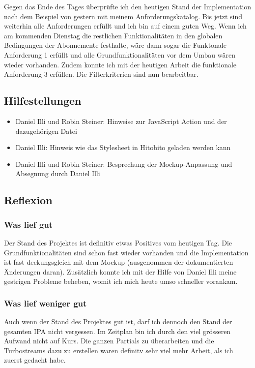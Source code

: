 Gegen das Ende des Tages überprüfte ich den heutigen Stand der Implementation nach dem Beispiel von gestern mit meinem Anforderungskatalog. Bis jetzt sind weiterhin
alle Anforderungen erfüllt und ich bin auf einem guten Weg. Wenn ich am kommenden Dienstag die restlichen Funktionalitäten in den globalen Bedingungen der Abonnemente
festhalte, wäre dann sogar die Funktonale Anforderung 1 erfüllt und alle Grundfunktionalitäten vor dem Umbau wären wieder vorhanden.  Zudem konnte ich mit der heutigen Arbeit 
die funktionale Anforderung 3 erfüllen. Die Filterkriterien sind nun bearbeitbar.

\subsection*{Hilfestellungen}
\begin{itemize}
    \item Daniel Illi und Robin Steiner: Hinweise zur JavaScript Action und der dazugehörigen Datei
    \item Daniel Illi: Hinweis wie das Stylesheet in Hitobito geladen werden kann
    \item Daniel Illi und Robin Steiner: Besprechung der Mockup-Anpassung und Absegnung durch Daniel Illi
\end{itemize}

\subsection*{Reflexion}

\subsubsection*{Was lief gut}
Der Stand des Projektes ist definitiv etwas Positives vom heutigen Tag. Die Grundfunktionalitäten sind schon fast wieder vorhanden
und die Implementation ist fast deckungsgleich mit dem Mockup (ausgenommen der dokumentierten Änderungen daran). Zusätzlich konnte ich mit der Hilfe
von Daniel Illi meine gestrigen Probleme beheben, womit ich mich heute umso schneller vorankam.

\subsubsection*{Was lief weniger gut}
Auch wenn der Stand des Projektes gut ist, darf ich dennoch den Stand der gesamten IPA nicht vergessen.
Im Zeitplan bin ich durch den viel grösseren Aufwand nicht auf Kurs. Die ganzen Partials zu überarbeiten und
die Turbostreams dazu zu erstellen waren definitv sehr viel mehr Arbeit, als ich zuerst gedacht habe.

